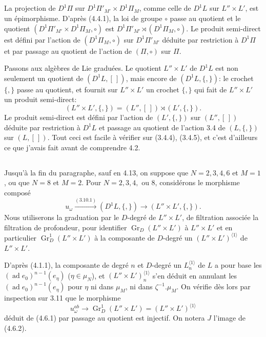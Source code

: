 \documentclass[11pt,a4paper]{article}
\theoremstyle{plain}
\theoremstyle{definition}
\DeclareMathOperator{\ad}{ad}
\newcommand{\Gr}{\operatorname{Gr}}
\begin{document}
\subsection{}
La projection de $D^1\Pi$ sur $D^1\Pi'_{M'} \times D^1\Pi_M$, comme celle de $D^1L$ sur $L'' \times L'$, est un \'epimorphisme. D'apr\`es (4.4.1), la loi de groupe $\circ$ passe au quotient et le quotient $(D^1\Pi'_{M'} \times D^1\Pi_M, \circ)$ est $D^1\Pi'_{M'} \rtimes (D^1\Pi_M, \circ)$. Le produit semi-direct est d\'efini par l'action de $(D^1\Pi_M, \circ)$ sur $D^1\Pi'_{M'}$ d\'eduite par restriction \`a $D^1\Pi$ et par passage au quotient de l'action de $(\Pi, \circ)$ sur $\Pi$.

Passons aux alg\`ebres de Lie gradu\'ees. Le quotient $L'' \times L'$ de $D^1L$ est non seulement un quotient de $(D^1L, [\,])$, mais encore de $(D^1L, \{,\})$: le crochet $\{,\}$ passe au quotient, et fournit sur $L'' \times L'$ un crochet $\{,\}$ qui fait de $L'' \times L'$ un produit semi-direct:
\[
(L'' \times L', \{,\}) = (L'', [\,]) \rtimes (L', \{,\}).
\]
Le produit semi-direct est d\'efini par l'action de $(L', \{,\})$ sur $(L'', [\,])$ d\'eduite par restriction \`a $D^1L$ et passage au quotient de l'action 3.4 de $(L, \{,\})$ sur $(L, [\,])$. Tout ceci est facile \`a v\'erifier sur (3.4.4), (3.4.5), et c'est d'ailleurs ce que j'avais fait avant de comprendre 4.2.

\subsection{}
Jusqu'\`a la fin du paragraphe, sauf en 4.13, on suppose que $N=2,3,4,6$ et $M=1$, ou que $N=8$ et $M=2$. Pour $N=2,3,4,$ ou $8$, consid\'erons le morphisme compos\'e
\begin{equation}\label{eq:4.6.1}
u_\omega \xrightarrow{(3.10.1)} (D^1L, \{,\}) \to (L'' \times L', \{,\}).
\end{equation}
Nous utiliserons la graduation par le $D$-degr\'e de $L'' \times L'$, de filtration associ\'ee la filtration de profondeur, pour identifier $\Gr_D(L'' \times L')$ \`a $L'' \times L'$ et en particulier $\Gr_D^1(L'' \times L')$ \`a la composante de $D$-degr\'e un $(L'' \times L')^{\langle 1 \rangle}$ de $L'' \times L'$.

D'apr\`es (4.1.1), la composante de degr\'e $n$ et $D$-degr\'e un $L^{\langle 1 \rangle}_n$ de $L$ a pour base les $(\ad e_0)^{n-1}(e_\eta)$ ($\eta \in \mu_N$), et $(L'' \times L')^{\langle 1 \rangle}_n$ s'en d\'eduit en annulant les $(\ad e_0)^{n-1}(e_\eta)$ pour $\eta$ ni dans $\mu_M$, ni dans $\zeta^{-1}.\mu_M$. On v\'erifie d\`es lors par inspection sur 3.11 que le morphisme
\begin{equation}\label{eq:4.6.2}
u_\omega^{ab} \to \Gr_D^1(L'' \times L') = (L'' \times L')^{\langle 1 \rangle}
\end{equation}
d\'eduit de (4.6.1) par passage au quotient est injectif. On notera $J$ l'image de (4.6.2).
\end{document}
